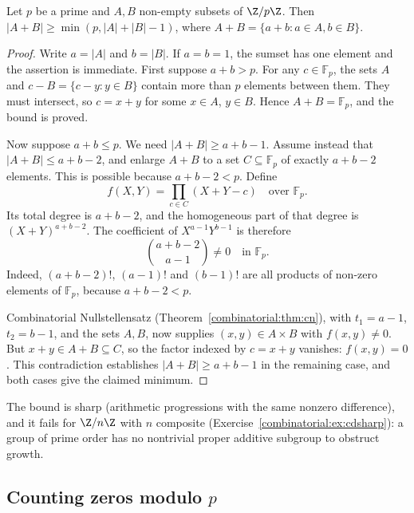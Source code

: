 \begin{theorem}\label{combinatorial:thm:cd}
Let $p$ be a prime and $A,B$ non-empty subsets of $\Z/p\Z$. Then $|A+B|\ge\min(p,|A|+|B|-1)$, where $A+B=\{a+b:a\in A,b\in B\}$.
\end{theorem}
\begin{proof}
Write $a=|A|$ and $b=|B|$.
If $a=b=1$, the sumset has one element and the assertion is immediate.
First suppose $a+b>p$. For any $c\in\mathbb F_p$,
the sets $A$ and $c-B=\{c-y:y\in B\}$ contain
more than $p$ elements between them.
They must intersect, so $c=x+y$ for some
$x\in A$, $y\in B$. Hence $A+B=\mathbb F_p$,
and the bound is proved.

Now suppose $a+b\le p$. We need
$|A+B|\ge a+b-1$. Assume instead that
$|A+B|\le a+b-2$, and enlarge $A+B$
to a set $C\subseteq\mathbb F_p$ of
exactly $a+b-2$ elements. This is possible
because $a+b-2<p$. Define
\[
f(X,Y)=\prod_{c\in C}(X+Y-c)
\quad\text{over }\mathbb F_p.
\]
Its total degree is $a+b-2$, and the
homogeneous part of that degree is
$(X+Y)^{a+b-2}$. The coefficient of
$X^{a-1}Y^{b-1}$ is therefore
\[
\binom{a+b-2}{a-1}\ne0
\quad\text{in }\mathbb F_p.
\]
Indeed, $(a+b-2)!$, $(a-1)!$ and $(b-1)!$
are all products of non-zero elements
of $\mathbb F_p$, because $a+b-2<p$.

Combinatorial Nullstellensatz
(Theorem~\ref{combinatorial:thm:cn}),
with $t_1=a-1$, $t_2=b-1$, and the
sets $A,B$, now supplies $(x,y)\in A\times B$
with $f(x,y)\ne0$. But $x+y\in A+B\subseteq C$,
so the factor indexed by $c=x+y$ vanishes:
$f(x,y)=0$. This contradiction establishes
$|A+B|\ge a+b-1$ in the remaining case,
and both cases give the claimed minimum.
\end{proof}

The bound is sharp (arithmetic progressions with the same nonzero difference), and it fails for $\Z/n\Z$ with $n$ composite (Exercise~\ref{combinatorial:ex:cdsharp}): a group of prime order has no nontrivial proper additive subgroup to obstruct growth.

\subsection*{Counting zeros modulo $p$}

